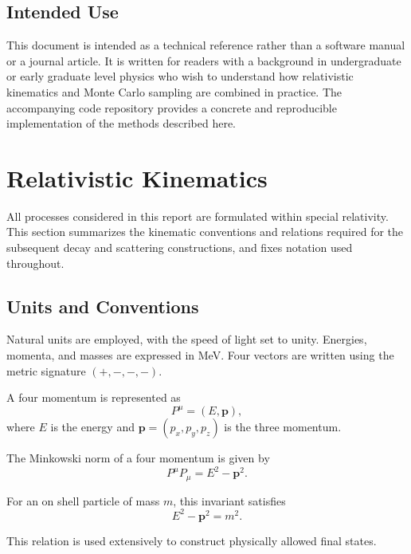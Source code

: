\documentclass[11pt,a4paper]{article}
\newcommand{\p}{\mathbf{p}}
\begin{document}
\subsection*{Intended Use}

This document is intended as a technical reference rather than a software manual or
a journal article. It is written for readers with a background in undergraduate or
early graduate level physics who wish to understand how relativistic kinematics and
Monte Carlo sampling are combined in practice. The accompanying code repository
provides a concrete and reproducible implementation of the methods described here.



\section{Relativistic Kinematics}
\label{sec:kinematics}

All processes considered in this report are formulated within special relativity.
This section summarizes the kinematic conventions and relations required for the
subsequent decay and scattering constructions, and fixes notation used throughout.

\subsection{Units and Conventions}

Natural units are employed, with the speed of light set to unity. Energies, momenta,
and masses are expressed in \si{MeV}. Four vectors are written using the metric
signature $(+,-,-,-)$.

A four momentum is represented as
\begin{equation}
P^\mu = (E, \p),
\end{equation}
where $E$ is the energy and $\p = (p_x, p_y, p_z)$ is the three momentum.

The Minkowski norm of a four momentum is given by
\begin{equation}
P^\mu P_\mu = E^2 - \p^2 .
\end{equation}

For an on shell particle of mass $m$, this invariant satisfies \cite{griffiths_qm}
\begin{equation}
E^2 - \p^2 = m^2 .
\end{equation}

This relation is used extensively to construct physically allowed final states.
\end{document}
